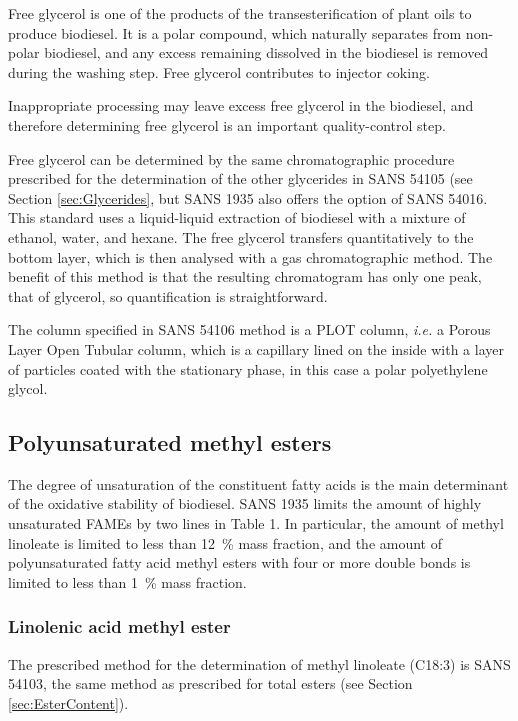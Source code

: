Free glycerol is one of the products of the transesterification of plant oils to
produce biodiesel. It is a polar compound, which naturally separates from
non-polar biodiesel, and any excess remaining dissolved in the biodiesel is
removed during the washing step. Free glycerol contributes to injector coking. 

Inappropriate processing may leave excess free glycerol in the biodiesel, and
therefore determining free glycerol is an important quality-control step.

Free glycerol can be determined by the same chromatographic procedure prescribed
for the determination of the other glycerides in SANS 54105 (see Section
\ref{sec:Glycerides}, but SANS 1935 also offers the option of SANS 54016. This
standard uses a liquid-liquid extraction of biodiesel with a mixture of ethanol,
water, and hexane. The free glycerol transfers quantitatively to the bottom
layer, which is then analysed with a gas chromatographic method. The benefit of
this method is that the resulting chromatogram has only one peak, that of
glycerol, so quantification is straightforward.

The column specified in SANS 54106 method is a PLOT column, \textit{i.e.} a
Porous Layer Open Tubular column, which is a capillary lined on the inside with
a layer of particles coated with the stationary phase, in this case a polar
polyethylene glycol. 

\subsection{Polyunsaturated methyl esters}
\label{sec:ChromDetUnsat}

The degree of unsaturation of the constituent fatty acids is the main
determinant of the oxidative stability of biodiesel. SANS 1935 limits the amount
of highly unsaturated FAMEs by two lines in Table 1. In particular, the amount
of methyl linoleate is limited to less than \SI{12}{\percent} mass fraction, and
the amount of polyunsaturated fatty acid methyl esters with four or more double
bonds is limited to less than \SI{1}{\percent} mass fraction.

\subsubsection{Linolenic acid methyl ester}

The prescribed method for the determination of methyl linoleate (C18:3) is SANS
54103, the same method as prescribed for total esters (see Section
\ref{sec:EsterContent}).

